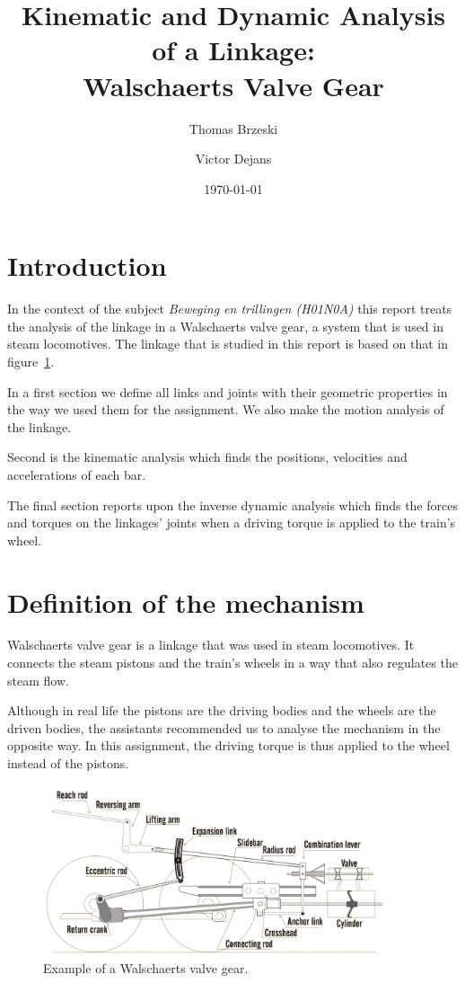 \documentclass[a4paper]{article}
\date{\today}
\author{Thomas Brzeski \and  Victor Dejans}
\title{Kinematic and Dynamic Analysis of a Linkage:\\ Walschaerts Valve Gear}
\begin{document}
\maketitle

\section*{Introduction}

In the context of the subject \textit{Beweging en trillingen (H01N0A)} this report treats the analysis of the linkage in a Walschaerts valve gear, a system that is used in steam locomotives. The linkage that is studied in this report is based on that in figure~\ref{fig:basistekening}.

In a first section we define all links and joints with their geometric properties in the way we used them for the assignment. We also make the motion analysis of the linkage.

Second is the kinematic analysis which finds the positions, velocities and accelerations of each bar.

The final section reports upon the inverse dynamic analysis which finds the forces and torques on the linkages' joints when a driving torque is applied to the train's wheel.



\tableofcontents
\clearpage

\section{Definition of the mechanism}

Walschaerts valve gear is a linkage that was used in steam locomotives. It connects the steam pistons and the train's wheels in a way that also regulates the steam flow.

Although in real life the pistons are the driving bodies and the wheels are the driven bodies, the assistants recommended us to analyse the mechanism in the opposite way. In this assignment, the driving torque is thus applied to the wheel instead of the pistons.

\begin{figure}[h]
	\includegraphics[width=0.9\textwidth]{wvgverslag.png}
	\centering
	\caption{Example of a Walschaerts valve gear. \cite{ove06}}
	\label{fig:basistekening}
\end{figure}
\end{document}
